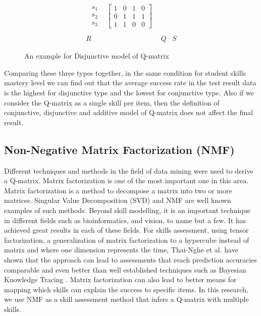 \begin{figure}
\begin{footnotesize}
\[\begin{array}{ccc}
\begin{array}{cc}
\begin{array}{c}
s_{1}\\
s_{2}\\
s_{3}
\end{array} & \left[\begin{array}{cccc}
1 & 0 & 1 & 0\\
0 & 1 & 1 & 1\\
1 & 1 & 0 & 0
\end{array}\right]
\end{array}\\
\\
R & Q & S
\end{array}
\]
 \end{footnotesize} \caption{An example for Disjunctive model of Q-matrix}


\label{fig1Dis} 
\end{figure}

Comparing these three types together, in the same condition for student skills mastery level we can find out that the average success rate in the test result data is the highest for disjunctive type and the lowest for conjunctive type. Also if we consider the Q-matrix as a single skill per item, then the definition of conjunctive, disjunctive and additive model of Q-matrix does not affect the final result.


\subsection{Non-Negative Matrix Factorization (\ac{NMF})}
\label{NMF_MODEL_ASSESS}

Different techniques and methods in the field of data mining were used to derive a Q-matrix. Matrix factorization is one of the most important one in this area. Matrix factorization is a method to decompose a matrix into two or more matrices. Singular Value Decomposition (SVD) and NMF are well known examples of such methods. Beyond skill modelling, it is an important technique in different fields such as bioinformatics, and vision, to name but a few. It has achieved great results in each of these fields. For skills assessment, using tensor factorization, a generalization of matrix factorization to a hypercube instead of matrix and where one dimension represents the time, Thai-Nghe et al. \citep{Nguyen2011} have shown that the approach can lead to assessments that reach prediction accuracies comparable and even better than well established techniques such as Bayesian Knowledge Tracing \citep{corbett:umuai:1995}. Matrix factorization can also lead to better means for mapping which skills can explain the success to specific items. In this research, we use NMF as a skill assessment method that infers a Q-matrix with multiple skills.


